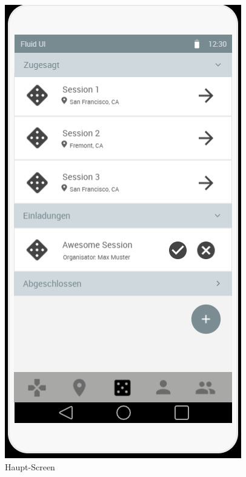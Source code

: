 \begin{figure}[H]
  \hfill
  \begin{minipage}[b]{0.4\textwidth}
    \includegraphics[width=\textwidth]{images/MainScreen.PNG}
    \caption{Haupt-Screen}
    \label{fig:mainschreen_2}
  \end{minipage}
\end{figure}

